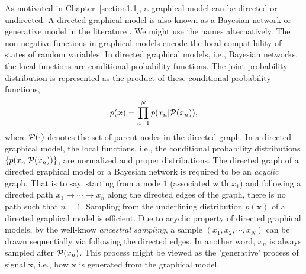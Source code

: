 As motivated in Chapter~\ref{section1.1}, a graphical model can be directed or undirected. A directed graphical model is also known as a Bayesian network or generative model in the literature \cite[Chapter~8]{Bishop:2006:PRM:1162264}. We might use the names alternatively. The non-negative functions in graphical models encode the local compatibility of states of random variables. In directed graphical models, i.e., Bayesian networks, the local functions are conditional probability functions. The joint probability distribution is represented as the product of these conditional probability functions,
\begin{equation}
  p(\bm{x}) = \prod_{n=1}^{N}p(x_n| \mathcal{P}(x_n)),
\end{equation}
where $\mathcal{P}(\cdot)$ denotes the set of parent nodes in the directed graph. In a directed graphical model, the local functions, i.e., the conditional probability distributions $\{p(x_n| \mathcal{P}(x_n))\}$, are normalized and proper distributions. The directed graph of a directed graphical model or a Bayesian network is required to be an \textit{acyclic} graph. That is to say, starting from a node $1$ (associated with $x_1$) and following a directed path $x_1\rightarrow \cdots \rightarrow x_n$ along the directed edges of the graph, there is no path such that $n=1$. Sampling from the underlining distribution $p(\bm{x})$ of a directed graphical model is efficient. Due to acyclic property of directed graphical models, by the well-know \textit{ancestral sampling}, a sample $(x_1, x_2, \cdots, x_N)$ can be drawn sequentially via following the directed edges. In another word, $x_n$ is always sampled after $\mathcal{P}(x_n)$. This process might be viewed as the 'generative' process of signal $\bm{x}$, i.e., how $\bm{x}$ is generated from the graphical model.

